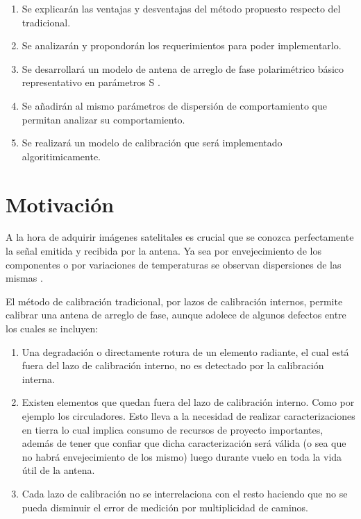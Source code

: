 \begin{enumerate}
    \item Se explicarán las ventajas y desventajas del método propuesto respecto del tradicional.
    \item Se analizarán y propondorán los requerimientos para poder implementarlo.
    \item Se desarrollará un modelo de antena de arreglo de fase polarimétrico 
			básico representativo en parámetros S \cite{Caspers}.
    \item Se añadirán al mismo parámetros de dispersión de comportamiento que 
			permitan analizar su comportamiento.
    \item Se realizará un modelo de calibración que será implementado algoritimicamente.
\end{enumerate}



\section{Motivación}

A la hora de adquirir imágenes satelitales es crucial que se conozca perfectamente la señal emitida y recibida por la antena. 
Ya sea por envejecimiento de los componentes \cite{Agrawal2003} o por variaciones de temperaturas se observan dispersiones de 
las mismas \cite{Keizer2011}. 

El método de calibración tradicional, por lazos de calibración internos, permite calibrar una antena de arreglo de fase, aunque 
adolece de algunos defectos entre los cuales se incluyen:

\begin{enumerate}
    \item Una degradación o directamente rotura de un elemento radiante, el cual está fuera del lazo de calibración interno, no 
			es detectado por la calibración interna.
    \item Existen elementos que quedan fuera del lazo de calibración interno. Como por ejemplo los circuladores. Esto lleva a 
			la necesidad de realizar caracterizaciones en tierra lo cual implica consumo de recursos de proyecto importantes, 
			además de tener que confiar que dicha caracterización será válida (o sea que no habrá envejecimiento de los mismo) 
			luego durante vuelo en toda la vida útil de la antena.
    \item Cada lazo de calibración no se interrelaciona con el resto haciendo que no se pueda disminuir el error de medición por 
			multiplicidad de caminos.
\end{enumerate}

